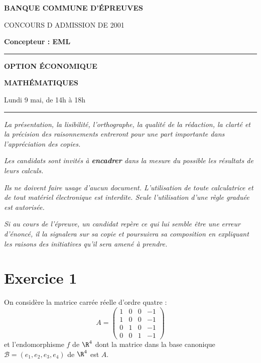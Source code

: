 \documentclass[11pt]{article}%
\begin{document}

\begin{center}
{\LARG\E\textbf{BANQUE COMMUNE D'ÉPREUVES}}



{\large \textsc{CONCOURS D ADMISSION DE 2001}}



{\large \textbf{Concepteur : EML}}



\rule{2.39cm}{0.05cm}



{\Large \textbf{OPTION ÉCONOMIQUE}}



{\Large \textbf{MATHÉMATIQUES }}



{\Large Lundi 9 mai, de 14h à 18h}



\rule{2.39cm}{0.05cm}
\end{center}

\textit{La présentation, la lisibilité, l'orthographe, la qualité
de la rédaction, la clarté et la précision des raisonnements
entreront pour une part importante dans l'appréciation des copies.}

\textit{Les candidats sont invités à \textbf{encadrer} dans la mesure
du possible les résultats de leurs calculs.}

\textit{Ils ne doivent faire usage d'aucun document. L'utilisation de
toute
calculatrice et de tout matériel électronique est interdite. Seule
l'utilisation d'une règle graduée est autorisée.}

\textit{Si au cours de l'épreuve, un candidat repère ce qui lui semble
être une erreur d'énoncé, il la signalera sur sa copie et
poursuivra sa composition en expliquant les raisons des initiatives
qu'il sera
amené à prendre.}

\vspace*{3cm}

\section*{Exercice 1}

\noindent On considère la matrice carrée réelle d'ordre quatre :
\[
A = \left(
\begin{array}{rrrr}
1 & 0 & 0 & -1 \\
1 & 0 & 0 & -1 \\
0 & 1 & 0 & -1 \\
0 & 0 & 1 & -1
\end{array}
\right)
\]
et l'endomorphisme $f$ de $\R^{4}$ dont la matrice dans la base
canonique $\mathcal{B} = (e_{1},e_{2},e_{3},e_{4})$ de $\R^{4}$ est
$A$.
\end{document}
